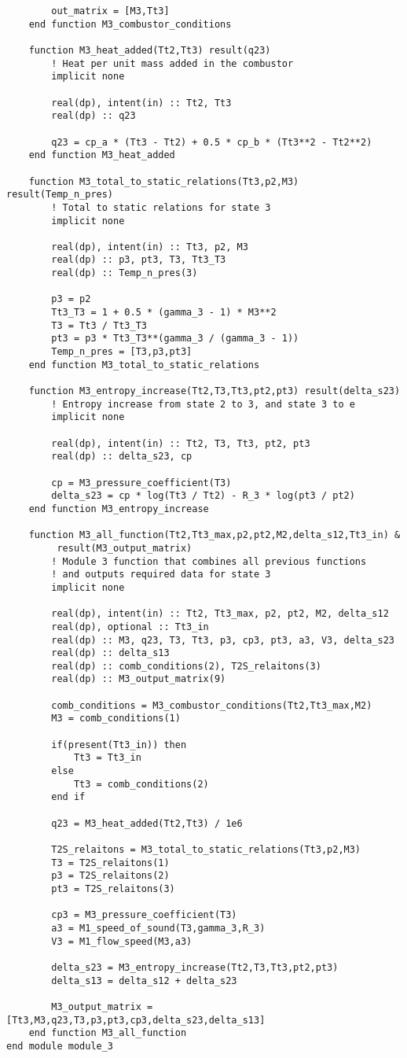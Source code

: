 \begin{verbatim}
        out_matrix = [M3,Tt3]
    end function M3_combustor_conditions

    function M3_heat_added(Tt2,Tt3) result(q23)
        ! Heat per unit mass added in the combustor
        implicit none

        real(dp), intent(in) :: Tt2, Tt3
        real(dp) :: q23

        q23 = cp_a * (Tt3 - Tt2) + 0.5 * cp_b * (Tt3**2 - Tt2**2)
    end function M3_heat_added

    function M3_total_to_static_relations(Tt3,p2,M3) result(Temp_n_pres)
        ! Total to static relations for state 3
        implicit none

        real(dp), intent(in) :: Tt3, p2, M3
        real(dp) :: p3, pt3, T3, Tt3_T3
        real(dp) :: Temp_n_pres(3)

        p3 = p2
        Tt3_T3 = 1 + 0.5 * (gamma_3 - 1) * M3**2
        T3 = Tt3 / Tt3_T3
        pt3 = p3 * Tt3_T3**(gamma_3 / (gamma_3 - 1))
        Temp_n_pres = [T3,p3,pt3]
    end function M3_total_to_static_relations

    function M3_entropy_increase(Tt2,T3,Tt3,pt2,pt3) result(delta_s23)
        ! Entropy increase from state 2 to 3, and state 3 to e
        implicit none

        real(dp), intent(in) :: Tt2, T3, Tt3, pt2, pt3
        real(dp) :: delta_s23, cp

        cp = M3_pressure_coefficient(T3)
        delta_s23 = cp * log(Tt3 / Tt2) - R_3 * log(pt3 / pt2)
    end function M3_entropy_increase

    function M3_all_function(Tt2,Tt3_max,p2,pt2,M2,delta_s12,Tt3_in) &
         result(M3_output_matrix)
        ! Module 3 function that combines all previous functions
        ! and outputs required data for state 3
        implicit none

        real(dp), intent(in) :: Tt2, Tt3_max, p2, pt2, M2, delta_s12
        real(dp), optional :: Tt3_in
        real(dp) :: M3, q23, T3, Tt3, p3, cp3, pt3, a3, V3, delta_s23
        real(dp) :: delta_s13
        real(dp) :: comb_conditions(2), T2S_relaitons(3)
        real(dp) :: M3_output_matrix(9)

        comb_conditions = M3_combustor_conditions(Tt2,Tt3_max,M2)
        M3 = comb_conditions(1)

        if(present(Tt3_in)) then
            Tt3 = Tt3_in
        else
            Tt3 = comb_conditions(2)
        end if

        q23 = M3_heat_added(Tt2,Tt3) / 1e6

        T2S_relaitons = M3_total_to_static_relations(Tt3,p2,M3)
        T3 = T2S_relaitons(1)
        p3 = T2S_relaitons(2)
        pt3 = T2S_relaitons(3)

        cp3 = M3_pressure_coefficient(T3)
        a3 = M1_speed_of_sound(T3,gamma_3,R_3)
        V3 = M1_flow_speed(M3,a3)

        delta_s23 = M3_entropy_increase(Tt2,T3,Tt3,pt2,pt3)
        delta_s13 = delta_s12 + delta_s23

        M3_output_matrix = [Tt3,M3,q23,T3,p3,pt3,cp3,delta_s23,delta_s13]
    end function M3_all_function
end module module_3
\end{verbatim}